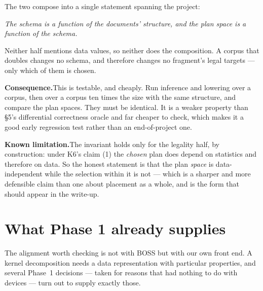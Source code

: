 \documentclass[11pt,a4paper]{article}
\newcommand{\limitation}[1]{%
  \par\noindent\textbf{Known limitation.}\quad #1\par\medskip}
\newcommand{\consequence}[1]{%
  \par\noindent\textbf{Consequence.}\quad #1\par\medskip}
\begin{document}
The two compose into a single statement spanning the project:

\begin{center}
\emph{The schema is a function of the documents' structure, and the plan space
is a function of the schema.}
\end{center}

\noindent
Neither half mentions data values, so neither does the composition. A corpus
that doubles changes no schema, and therefore changes no fragment's legal
targets --- only which of them is chosen.

\consequence{This is testable, and cheaply. Run inference and lowering over a
corpus, then over a corpus ten times the size with the same structure, and
compare the plan spaces. They must be identical. It is a weaker property than
§5's differential correctness oracle and far cheaper to check, which makes it
a good early regression test rather than an end-of-project one.}

\limitation{The invariant holds only for the legality half, by construction:
under K6's claim (1) the \emph{chosen} plan does depend on statistics and
therefore on data. So the honest statement is that the plan \emph{space} is
data-independent while the selection within it is not --- which is a sharper
and more defensible claim than one about placement as a whole, and is the form
that should appear in the write-up.}

\section{What Phase 1 already supplies}

The alignment worth checking is not with BOSS but with our own front end. A
kernel decomposition needs a data representation with particular properties,
and several Phase~1 decisions --- taken for reasons that had nothing to do with
devices --- turn out to supply exactly those.
\end{document}
